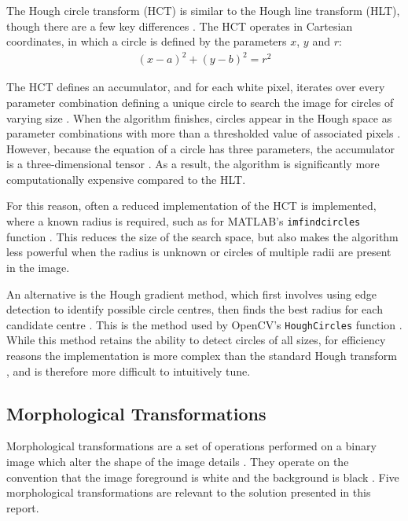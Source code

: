 The Hough circle transform (HCT) is similar to the Hough line transform (HLT), though there are a few key differences \cite{opencv_hct}. The HCT operates in Cartesian coordinates, in which a circle is defined by the parameters $x$, $y$ and $r$:
\begin{align}
  (x - a)^2 + (y - b)^2 = r^2
\end{align}

The HCT defines an accumulator, and for each white pixel, iterates over every parameter combination defining a unique circle to search the image for circles of varying size \cite{korting_hct}. When the algorithm finishes, circles appear in the Hough space as parameter combinations with more than a thresholded value of associated pixels \cite{korting_hct}. However, because the equation of a circle has three parameters, the accumulator is a three-dimensional tensor \cite{wikipedia_hct}. As a result, the algorithm is significantly more computationally expensive compared to the HLT.

For this reason, often a reduced implementation of the HCT is implemented, where a known radius is required, such as for MATLAB's \texttt{imfindcircles} function \cite{mathworks_imfindcircles}. This reduces the size of the search space, but also makes the algorithm less powerful when the radius is unknown or circles of multiple radii are present in the image.

An alternative is the Hough gradient method, which first involves using edge detection to identify possible circle centres, then finds the best radius for each candidate centre \cite{opencv_hct}. This is the method used by OpenCV's \texttt{HoughCircles} function \cite{opencv_hct}. While this method retains the ability to detect circles of all sizes, for efficiency reasons the implementation is more complex than the standard Hough transform \cite{opencv_hct}, and is therefore more difficult to intuitively tune.

\subsection{Morphological Transformations}

Morphological transformations are a set of operations performed on a binary image which alter the shape of the image details \cite{opencv_mt}. They operate on the convention that the image foreground is white and the background is black \cite{opencv_mt}. Five morphological transformations are relevant to the solution presented in this report.

